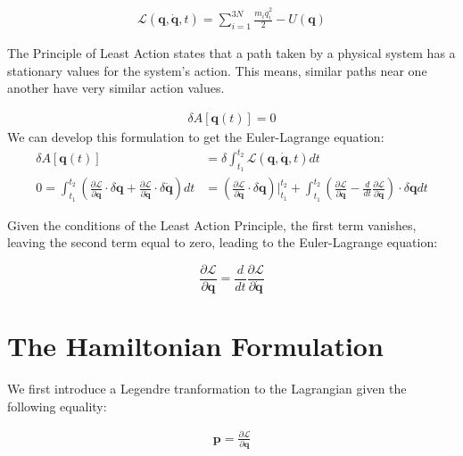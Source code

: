 \documentclass[draft]{agujournal2019}
\begin{document}
\begin{align}
    \mathcal{L} \left(\mathbf{q}, \dot{\mathbf{q}}, t \right) = \sum_{i = 1}^{3N} \frac{m_i \dot{q}_i^2}{2} - U(\mathbf{q})
\end{align}

\begin{definition}
    The Principle of Least Action states that a path taken by a physical system has a stationary values for the system's action. This means, similar paths near one another have very similar action values.

\begin{align}
    \delta A\left[ \mathbf{q}(t) \right] = 0
\end{align}
We can develop this formulation to get the Euler-Lagrange equation:
\begin{align}
    \delta A\left[ \mathbf{q}(t) \right] &= \delta \int_{t_1}^{t_2} \mathcal{L}\left(\mathbf{q}, \dot{\mathbf{q}}, t\right) dt \\
    0 = \int_{t_1}^{t_2} \left( \frac{\partial \mathcal{L}}{\partial \mathbf{q}} \cdot \delta \mathbf{q} + \frac{\partial \mathcal{L}}{\partial \dot{\mathbf{q}}} \cdot \delta \dot{\mathbf{q}} \right)dt &= \left( \frac{\partial \mathcal{L}}{\partial \mathbf{q}} \cdot \delta \mathbf{q} \right) \Big\vert_{t_1}^{t_2} + \int_{t_1}^{t_2} \left( \frac{\partial \mathcal{L}}{\partial \mathbf{q}} - \frac{d}{dt} \frac{\partial \mathcal{L}}{\partial \dot{\mathbf{q}}}  \right) \cdot \delta \mathbf{q} dt
\end{align}

Given the conditions of the Least Action Principle, the first term vanishes, leaving the second term equal to zero, leading to the Euler-Lagrange equation:

\begin{equation}
    \frac{\partial \mathcal{L}}{\partial \mathbf{q}} = \frac{d}{dt} \frac{\partial \mathcal{L}}{\partial \dot{\mathbf{q}}}
\end{equation}

\end{definition}

\section{The Hamiltonian Formulation}

We first introduce a Legendre tranformation to the Lagrangian given the following equality:

\begin{align}
    \mathbf{p} = \frac{\partial \mathcal{L}}{\partial \mathbf{q}}
\end{align}
\end{document}
